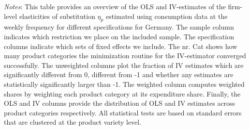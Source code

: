 \begin{landscape}
    \begin{table}[H]
        \centering
        \caption{Weekly Firm-level Elasticities: Dispersion instrument - Germany}
        \label{tab: app_elas_eta_cats_weekly_q_DE}
        \begin{spacing}{1}
        \end{spacing}
        \parbox{1.2\textwidth}{
        \vspace{10pt}
        \begin{spacing}{1} 
            {\footnotesize 
            \textit{Notes}: This table provides an overview of the OLS and IV-estimates of the firm-level elasticities of substitution $\eta_p$ estimated using consumption data at the weekly frequency for different specifications for Germany. The sample column indicates which restriction we place on the included sample. The specification columns indicate which sets of fixed effects we include. The nr. Cat shows how many product categories the minimization routine for the IV-estimator converged successfully. The unweighted columns plot the fraction of IV estimates which are significantly different from 0, different from -1 and whether any estimates are statistically significantly larger than -1. The weighted column computes weighted shares by weighting each product category at its expenditure share. Finally, the OLS and IV columns provide the distribution of OLS and IV estimates across product categories respectively. All statistical tests are based on standard errors that are clustered at the product variety level.}
            \end{spacing}}
    \end{table}
\end{landscape}

